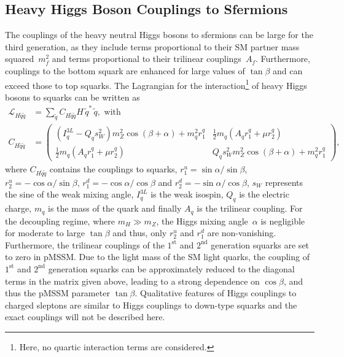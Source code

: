 \documentclass[11pt,a4paper]{article}
\begin{document}
\subsection*{Heavy Higgs Boson Couplings to Sfermions}\label{sec_sfermioncoupling}
The couplings of the heavy neutral Higgs bosons to sfermions can be large for the third generation, as they include terms proportional to their SM partner mass squared~$m^2_f$ and terms proportional to their trilinear couplings~$A_f$. Furthermore, couplings to the bottom squark are enhanced for large values of $\tan\beta$ and can exceed those to top squarks. The Lagrangian for the interaction\footnote{Here, no quartic interaction terms are considered.} of heavy Higgs bosons to squarks can be written as
\begin{align}
\mathcal{L}_{H\tilde{q}\tilde{q}} &= \sum_{\tilde{q}} C_{H\tilde{q}\tilde{q}} H\,\tilde{q}^*\,\tilde{q},\text{ with}\nonumber\\
C_{H\tilde{q}\tilde{q}} &= \begin{pmatrix}
\left(I_q^{3L} - Q_q s_W^2\right)m_Z^2\cos(\beta + \alpha) + m_q^2 r^q_1 & \frac{1}{2}m_q\left(A_q r_1^q + \mu r_2^q\right)\\
\frac{1}{2}m_q\left(A_q r_1^q + \mu r_2^q\right)	& Q_q s_W^2m_Z^2\cos(\beta + \alpha) + m_q^2 r^q_1
\end{pmatrix},\label{eq_squarkmixing}
\end{align}
where $C_{H\tilde{q}\tilde{q}}$ contains the couplings to squarks, $r_1^u = \sin\alpha/\sin\beta$, $r_2^u = -\cos\alpha/\sin\beta$, $r_1^d = -\cos\alpha/\cos\beta$ and $r_2^d = -\sin\alpha/\cos\beta$, $s_W$ represents the sine of the weak mixing angle, $I_q^{3L}$ is the weak isospin, $Q_q$ is the electric charge, $m_q$ is the mass of the quark and finally $A_q$ is the trilinear coupling. For the decoupling regime, where $m_H\gg m_Z$, the Higgs mixing angle~$\alpha$ is negligible for moderate to large $\tan\beta$ and thus, only $r_2^u$ and $r_1^d$ are non-vanishing. Furthermore, the trilinear couplings of the $1^\text{st}$ and $2^\text{nd}$ generation squarks are set to zero in pMSSM. Due to the light mass of the SM light quarks, the coupling of $1^\text{st}$ and $2^\text{nd}$ generation squarks can be approximately reduced to the diagonal terms in the matrix given above, leading to a strong dependence on $\cos\beta$, and thus the pMSSM parameter $\tan\beta$. Qualitative features of Higgs couplings to charged sleptons are similar to Higgs couplings to down-type squarks and the exact couplings will not be described here.
\end{document}
